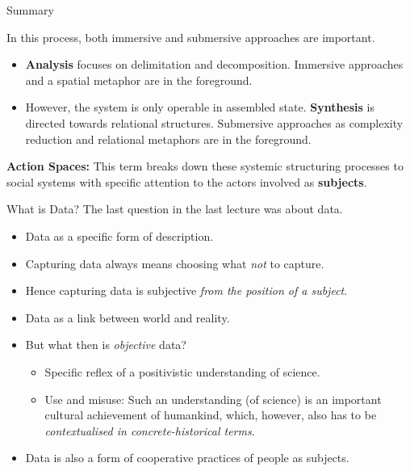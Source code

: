 \documentclass{beamer}
\begin{document}
\begin{frame}{Summary}

In this process, both immersive and submersive approaches are important.
\begin{itemize}
\item \textbf{Analysis} focuses on delimitation and decomposition.  Immersive
  approaches and a spatial metaphor are in the foreground.
\item However, the system is only operable in assembled state.
  \textbf{Synthesis} is directed towards relational structures. Submersive
  approaches as complexity reduction and relational metaphors are in the
  foreground.
\end{itemize}

\textbf{Action Spaces:} This term breaks down these systemic structuring
processes to social systems with specific attention to the actors involved as
\textbf{subjects}.
\end{frame}
\begin{frame}{What is Data?}
The last question in the last lecture was about data. 
  
  \begin{itemize}
  \item Data as a specific form of description.
  \item Capturing data always means choosing what \emph{not} to capture.
  \item Hence capturing data is subjective \emph{from the position of a
    subject}.
  \item Data as a link between world and reality.
  \item But what then is \emph{objective} data?
    \begin{itemize}
    \item Specific reflex of a positivistic understanding of science.
    \item Use and misuse: Such an understanding (of science) is an important
      cultural achievement of humankind, which, however, also has to be
      \emph{contextualised in concrete-historical terms}.
    \end{itemize}
  \item Data is also a form of cooperative practices of people as subjects.
  \end{itemize}
\end{frame}
\end{document}
